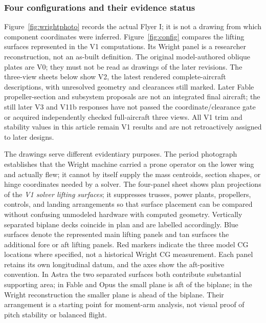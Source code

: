 \documentclass[11pt,a4paper]{article}
\begin{document}
\subsubsection{Four configurations and their evidence status}
Figure~\ref{fig:wrightphoto} records the actual Flyer I; it is not a drawing from which component coordinates were inferred. Figure~\ref{fig:config} compares the lifting surfaces represented in the V1 computations. Its Wright panel is a researcher reconstruction, not an as-built definition. The original model-authored oblique plates are V0; they must not be read as drawings of the later revisions. The three-view sheets below show V2, the latest rendered complete-aircraft descriptions, with unresolved geometry and clearances still marked. Later Fable propeller-section and subsystem proposals are not an integrated final aircraft; the still later V3 and V11b responses have not passed the coordinate/clearance gate or acquired independently checked full-aircraft three views. All V1 trim and stability values in this article remain V1 results and are not retroactively assigned to later designs.

The drawings serve different evidentiary purposes. The period photograph establishes that the Wright machine carried a prone operator on the lower wing and actually flew; it cannot by itself supply the mass centroids, section shapes, or hinge coordinates needed by a solver. The four-panel sheet shows plan projections of the \emph{V1 solver lifting surfaces}; it suppresses trusses, power plants, propellers, controls, and landing arrangements so that surface placement can be compared without confusing unmodeled hardware with computed geometry. Vertically separated biplane decks coincide in plan and are labelled accordingly. Blue surfaces denote the represented main lifting panels and tan surfaces the additional fore or aft lifting panels. Red markers indicate the three model CG locations where specified, not a historical Wright CG measurement. Each panel retains its own longitudinal datum, and the axes show the aft-positive convention. In Astra the two separated surfaces both contribute substantial supporting area; in Fable and Opus the small plane is aft of the biplane; in the Wright reconstruction the smaller plane is ahead of the biplane. Their arrangement is a starting point for moment-arm analysis, not visual proof of pitch stability or balanced flight.
\end{document}
